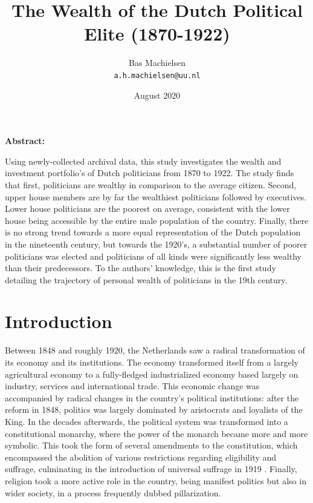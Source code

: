 
\usepackage[utf8]{inputenc}

\title{The Wealth of the Dutch Political Elite (1870-1922)}
\author{
  Bas Machielsen\\
  \texttt{a.h.machielsen@uu.nl}
}

\date{August 2020}



\maketitle

\begin{center}
\textbf{Abstract:}
\end{center}
    Using newly-collected archival data, this study investigates the wealth and investment portfolio's of Dutch politicians from 1870 to 1922. The study finds that first, politicians are wealthy in comparison to the average citizen. Second, upper house members are by far the wealthiest politicians followed by executives. Lower house politicians are the poorest on average, consistent with the lower house being accessible by the entire male population of the country. Finally, there is no strong trend towards a more equal representation of the Dutch population in the nineteenth century, but towards the 1920's, a substantial number of poorer politicians was elected and politicians of all kinds were significantly less wealthy than their predecessors. To the authors' knowledge, this is the first study detailing the trajectory of personal wealth of politicians in the 19th century.
\clearpage

\section{Introduction}
    
    Between 1848 and roughly 1920, the Netherlands saw a radical transformation of its economy and its institutions. The economy transformed itself from a largely agricultural economy to a fully-fledged industrialized economy based largely on industry, services and international trade.\autocite{van2004strictures} This economic change was accompanied by radical changes in the country’s political institutions: after the reform in 1848, politics was largely dominated by aristocrats and loyalists of the King. In the decades afterwards, the political system was transformed into a constitutional monarchy, where the power of the monarch became more and more symbolic. This took the form of several amendments to the constitution, which encompassed the abolition of various restrictions regarding eligibility and suffrage, culminating in the introduction of universal suffrage in 1919 \autocite{van2018tussen}. Finally, religion took a more active role in the country, being manifest politics but also in wider society, in a process frequently dubbed pillarization. 

